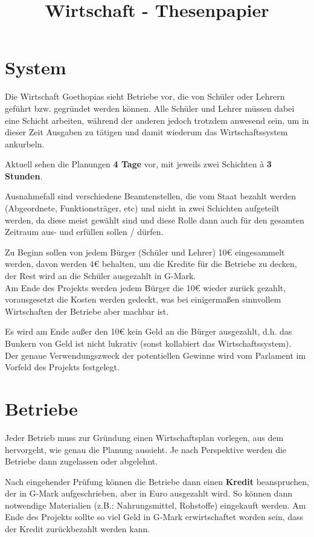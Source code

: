 \documentclass{sasbase}
\begin{document}
\onecolumn
\title{Wirtschaft - Thesenpapier}

\mytitle

\setlength{\parindent}{0mm}
\setlength{\parskip}{2mm}

\section{System}

Die Wirtschaft Goethopias sieht Betriebe vor, die von Schüler oder Lehrern geführt bzw. gegründet
werden können.
Alle Schüler und Lehrer müssen dabei eine Schicht arbeiten, während der anderen jedoch trotzdem
anwesend sein, um in dieser Zeit Ausgaben zu tätigen und damit wiederum das Wirtschaftssystem
ankurbeln.

Aktuell sehen die Planungen \textbf{4 Tage} vor, mit jeweils zwei Schichten à \textbf{3 Stunden}.

Ausnahmefall sind verschiedene Beamtenstellen, die vom Staat bezahlt werden (Abgeordnete,
Funktionsträger, etc) und nicht in zwei Schichten aufgeteilt werden, da diese meist gewählt sind
und diese Rolle dann auch für den gesamten Zeitraum aus- und erfüllen sollen / dürfen.

Zu Beginn sollen von jedem Bürger (Schüler und Lehrer) 10€ eingesammelt werden, davon
werden 4€ behalten, um die Kredite für die Betriebe zu decken, der Rest wird an die Schüler
ausgezahlt in G-Mark.\\
Am Ende des Projekts werden jedem Bürger die 10€ wieder zurück gezahlt, vorausgesetzt die Kosten
werden gedeckt, was bei einigermaßen sinnvollem Wirtschaften der Betriebe aber machbar ist.

Es wird am Ende außer den 10€ kein Geld an die Bürger ausgezahlt, d.h. das Bunkern von Geld ist
nicht lukrativ (sonst kollabiert das Wirtschaftssystem).\\
Der genaue Verwendungszweck der potentiellen Gewinne wird vom Parlament im Vorfeld des Projekts
festgelegt.

\section{Betriebe}

Jeder Betrieb muss zur Gründung einen Wirtschaftsplan vorlegen, aus dem hervorgeht, wie genau
die Planung aussieht. Je nach Perspektive werden die Betriebe dann zugelassen oder abgelehnt.

Nach eingehender Prüfung können die Betriebe dann einen \textbf{Kredit} beanspruchen, der in G-Mark
aufgeschrieben, aber in Euro ausgezahlt wird. So können dann notwendige Materialien (z.B.:
Nahrungsmittel, Rohstoffe) eingekauft werden. Am Ende des Projekts sollte so viel Geld in
G-Mark erwirtschaftet worden sein, dass der Kredit zurückbezahlt werden kann.
\end{document}
